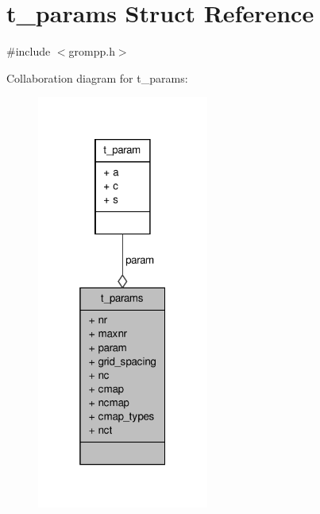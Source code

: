 \hypertarget{structt__params}{\section{t\-\_\-params \-Struct \-Reference}
\label{structt__params}
}


{\ttfamily \#include $<$grompp.\-h$>$}



\-Collaboration diagram for t\-\_\-params\-:
\nopagebreak
\begin{figure}[H]
\begin{center}
\leavevmode
\includegraphics[width=160pt]{structt__params__coll__graph}
\end{center}
\end{figure}
